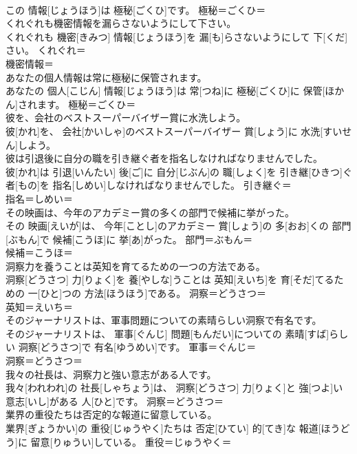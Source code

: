 \documentclass[8pt]{extreport}
\begin{document}
\begin{CJK}{UTF8}{min}
\\	この 情報[じょうほう]は 極秘[ごくひ]です。	極秘＝ごくひ＝ 
\\	くれぐれも機密情報を漏らさないようにして下さい。	
\\	くれぐれも 機密[きみつ] 情報[じょうほう]を 漏[も]らさないようにして 下[くだ]さい。	くれぐれ＝ 
\\	機密情報＝ 
\\	あなたの個人情報は常に極秘に保管されます。	
\\	あなたの 個人[こじん] 情報[じょうほう]は 常[つね]に 極秘[ごくひ]に 保管[ほかん]されます。	極秘＝ごくひ＝ 
\\	彼を、会社のベストスーパーバイザー賞に水洗しよう。	
\\	彼[かれ]を、 会社[かいしゃ]のベストスーパーバイザー 賞[しょう]に 水洗[すいせん]しよう。	
\\	彼は引退後に自分の職を引き継ぐ者を指名しなければなりませんでした。	
\\	彼[かれ]は 引退[いんたい] 後[ご]に 自分[じぶん]の 職[しょく]を 引き継[ひきつ]ぐ 者[もの]を 指名[しめい]しなければなりませんでした。	引き継ぐ＝ 
\\	指名＝しめい＝ 
\\	その映画は、今年のアカデミー賞の多くの部門で候補に挙がった。	
\\	その 映画[えいが]は、 今年[ことし]のアカデミー 賞[しょう]の 多[おお]くの 部門[ぶもん]で 候補[こうほ]に 挙[あ]がった。	部門＝ぶもん＝ 
\\	候補＝こうほ＝ 
\\	洞察力を養うことは英知を育てるための一つの方法である。	
\\	洞察[どうさつ] 力[りょく]を 養[やしな]うことは 英知[えいち]を 育[そだ]てるための 一[ひと]つの 方法[ほうほう]である。	洞察＝どうさつ＝ 
\\	英知＝えいち＝ 
\\	そのジャーナリストは、軍事問題についての素晴らしい洞察で有名です。	
\\	そのジャーナリストは、 軍事[ぐんじ] 問題[もんだい]についての 素晴[すば]らしい 洞察[どうさつ]で 有名[ゆうめい]です。	軍事＝ぐんじ＝ 
\\	洞察＝どうさつ＝ 
\\	我々の社長は、洞察力と強い意志がある人です。	
\\	我々[われわれ]の 社長[しゃちょう]は、 洞察[どうさつ] 力[りょく]と 強[つよ]い 意志[いし]がある 人[ひと]です。	洞察＝どうさつ＝ 
\\	業界の重役たちは否定的な報道に留意している。	
\\	業界[ぎょうかい]の 重役[じゅうやく]たちは 否定[ひてい] 的[てき]な 報道[ほうどう]に 留意[りゅうい]している。	重役＝じゅうやく＝ 

\end{CJK}
\end{document}
